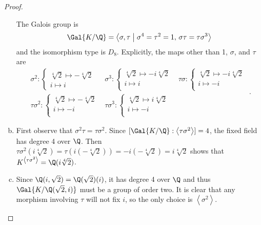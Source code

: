 \documentclass[10pt]{amsart}
\begin{document}
\begin{thm}
\begin{proof}
\begin{enumerate}[(a)]
      The Galois group is
      $$\Gal{K/\Q} = \left< \sigma, \tau \;\middle\vert\; \sigma^4 = \tau^2 = 1,\, \sigma\tau = \tau\sigma^3 \right>$$
      and the isomorphism type is $D_8$.
      Explicitly, the maps other than 1, $\sigma$, and $\tau$ are
      $$\begin{array}{ccc}
      \sigma^2 \colon \left\{
      \begin{array}{l}
        \sqrt[4]{2} \mapsto -\sqrt[4]{2}\\
        i \mapsto i
      \end{array}
      \right.&
      \sigma^3 \colon \left\{
      \begin{array}{l}
        \sqrt[4]{2} \mapsto -i\sqrt[4]{2}\\
        i \mapsto i\\
      \end{array}
      \right.&
      \tau\sigma \colon
      \left\{
      \begin{array}{l}
        \sqrt[4]{2} \mapsto -i\sqrt[4]{2}\\
        i \mapsto -i\\
      \end{array}
      \right.\\
      \tau\sigma^2 \colon \left\{
      \begin{array}{l}
        \sqrt[4]{2} \mapsto -\sqrt[4]{2}\\
        i \mapsto -i\\
      \end{array}
      \right.
      &
      \tau\sigma^3 \colon 
      \left\{
      \begin{array}{l}
        \sqrt[4]{2} \mapsto i\sqrt[4]{2}\\
        i \mapsto -i\\
      \end{array}
      \right.
      \end{array}.$$
    \item
      First observe that $\sigma^2\tau = \tau\sigma^2$.
      Since $[\Gal{K/\Q} : \left<\tau\sigma^2\right>] = 4$, the fixed field has degree 4 over $\Q$.
      Then $\tau\sigma^2(i\sqrt[4]{2}) = \tau(i(-\sqrt[4]{2})) = -i(-\sqrt[4]{2}) = i\sqrt[4]{2}$ shows that $K^{\left<\tau\sigma^2\right>} = \Q(i\sqrt[4]{2})$.
    \item
      Since $\Q(i,\sqrt{2}) = \Q(\sqrt{2})(i)$, it has degree 4 over $\Q$ and thus $\Gal{K/\Q(\sqrt{2}, i)}$ must be a group of order two.
      It is clear that any morphism involving $\tau$ will not fix $i$, so the only choice is $\left<\sigma^2\right>$.

\end{enumerate}
\end{proof}
\end{thm}
\end{document}
